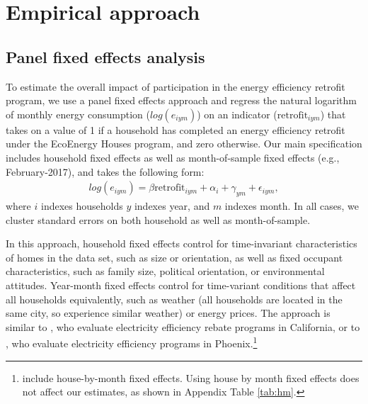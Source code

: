 \documentclass{article}
\begin{document}




\section{Empirical approach}

\subsection{Panel fixed effects analysis}
To estimate the overall impact of participation in the energy efficiency retrofit program, we use a panel fixed effects approach and regress the natural logarithm of monthly energy consumption ($log(e_{iym})$) on an indicator ($\text{retrofit}_{iym}$) that takes on a value of 1 if a household has completed an energy efficiency retrofit under the EcoEnergy Houses program, and zero otherwise. Our main specification includes household fixed effects as well as month-of-sample fixed effects (e.g., February-2017), and takes the following form:
\begin{align}
	log(e_{iym}) = \beta \text{retrofit}_{iym} + \alpha_i + \gamma_{ym} + \epsilon_{iym},
	\label{eq:did}
\end{align}
where $i$ indexes households $y$ indexes year, and $m$ indexes month. In all cases, we cluster standard errors on both household as well as month-of-sample.

In this approach, household fixed effects control for time-invariant characteristics of homes in the data set, such as size or orientation, as well as fixed occupant characteristics, such as family size, political orientation, or environmental attitudes. Year-month fixed effects control for time-variant conditions that affect all households equivalently, such as weather (all households are located in the same city, so experience similar weather) or energy prices. The approach is similar to \cite{chuang2022residential}, who evaluate electricity efficiency rebate programs in California, or to \cite{liang2018energy}, who evaluate electricity efficiency programs in Phoenix.\footnote{\cite{chuang2022residential} include house-by-month fixed effects. Using house by month fixed effects does not affect our estimates, as shown in Appendix Table \ref{tab:hm}.}
\end{document}
